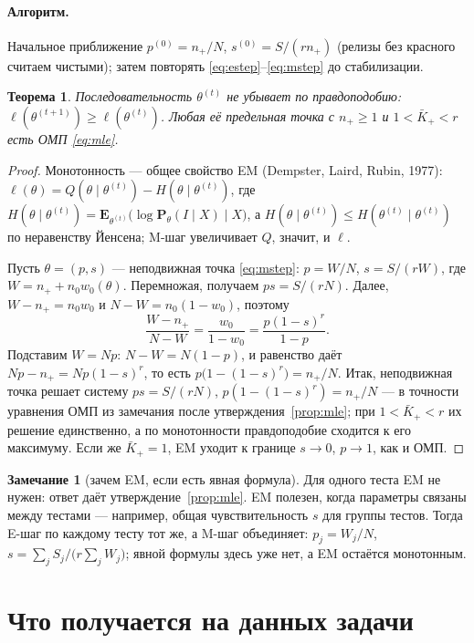 \documentclass[11pt,a4paper]{article}
\newcommand{\E}{\mathbf{E}}
\newcommand{\Prob}{\mathbf{P}}
\theoremstyle{plain}
\newtheorem{theorem}{Теорема}
\theoremstyle{definition}
\newtheorem{remark}{Замечание}
\begin{document}
\paragraph{Алгоритм.} Начальное приближение $p^{(0)}=n_+/N$, $s^{(0)}=S/(rn_+)$ (релизы без красного считаем чистыми); затем повторять \eqref{eq:estep}--\eqref{eq:mstep} до стабилизации.

\begin{theorem}
Последовательность $\theta^{(t)}$ не убывает по правдоподобию: $\ell(\theta^{(t+1)})\ge\ell(\theta^{(t)})$. Любая её предельная точка с $n_+\ge1$ и $1<\bar K_+<r$ есть ОМП \eqref{eq:mle}.
\end{theorem}

\begin{proof}
Монотонность --- общее свойство EM (Dempster, Laird, Rubin, 1977): $\ell(\theta)=Q(\theta\mid\theta^{(t)})-H(\theta\mid\theta^{(t)})$, где $H(\theta\mid\theta^{(t)})=\E_{\theta^{(t)}}\bigl(\log\Prob_\theta(I\mid X)\mid X\bigr)$, а $H(\theta\mid\theta^{(t)})\le H(\theta^{(t)}\mid\theta^{(t)})$ по неравенству Йенсена; M-шаг увеличивает $Q$, значит, и $\ell$.

Пусть $\theta=(p,s)$ --- неподвижная точка \eqref{eq:mstep}: $p=W/N$, $s=S/(rW)$, где $W=n_++n_0w_0(\theta)$. Перемножая, получаем $ps=S/(rN)$. Далее, $W-n_+=n_0w_0$ и $N-W=n_0(1-w_0)$, поэтому
\[
\frac{W-n_+}{N-W}=\frac{w_0}{1-w_0}=\frac{p(1-s)^r}{1-p}.
\]
Подставим $W=Np$: $N-W=N(1-p)$, и равенство даёт $Np-n_+=Np(1-s)^r$, то есть $p\bigl(1-(1-s)^r\bigr)=n_+/N$. Итак, неподвижная точка решает систему $ps=S/(rN)$, $p(1-(1-s)^r)=n_+/N$ --- в точности уравнения ОМП из замечания после утверждения~\ref{prop:mle}; при $1<\bar K_+<r$ их решение единственно, а по монотонности правдоподобие сходится к его максимуму. Если же $\bar K_+=1$, EM уходит к границе $s\to0$, $p\to1$, как и ОМП.
\end{proof}

\begin{remark}[зачем EM, если есть явная формула]
Для одного теста EM не нужен: ответ даёт утверждение~\ref{prop:mle}. EM полезен, когда параметры связаны между тестами --- например, общая чувствительность $s$ для группы тестов. Тогда E-шаг по каждому тесту тот же, а M-шаг объединяет: $p_j=W_j/N$, $s=\sum_jS_j\big/\bigl(r\sum_jW_j\bigr)$; явной формулы здесь уже нет, а EM остаётся монотонным.
\end{remark}

\section{Что получается на данных задачи}
\end{document}
